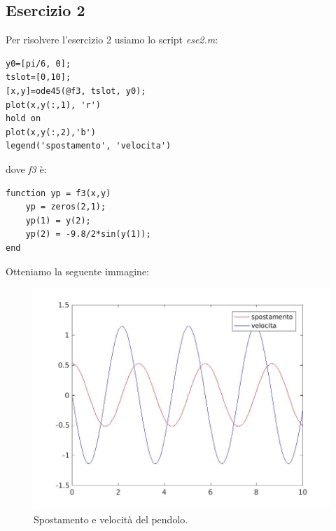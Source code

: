 \documentclass[11pt,a4paper,twoside,openright,titlepage,
headinclude,footinclude,BCOR5mm,
numbers=noenddot,cleardoublepage=empty,
tablecaptionabove]{scrbook}
\begin{document}
\subsection{Esercizio 2}
Per risolvere l'esercizio 2 usiamo lo script \emph{ese2.m}:
\begin{lstlisting}[frame=trBL]
y0=[pi/6, 0];
tslot=[0,10];
[x,y]=ode45(@f3, tslot, y0);
plot(x,y(:,1), 'r')
hold on
plot(x,y(:,2),'b')
legend('spostamento', 'velocita')
\end{lstlisting}
dove \emph{f3} è:
\begin{lstlisting}[frame=trbl]
function yp = f3(x,y)
    yp = zeros(2,1);
    yp(1) = y(2);
    yp(2) = -9.8/2*sin(y(1));
end
\end{lstlisting}
Otteniamo la seguente immagine:
\begin{center}
\begin{figure}[h!]
\includegraphics[width=\textwidth]{figs/ese2.jpg}
\caption{Spostamento e velocità del pendolo.}
\end{figure}
\end{center}
\end{document}
